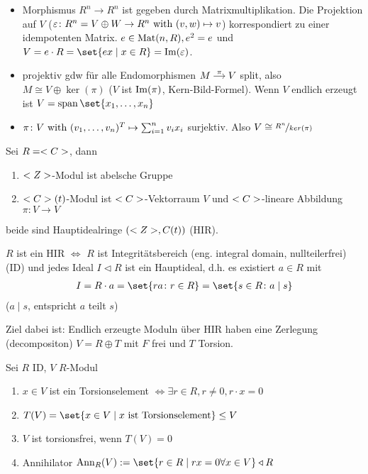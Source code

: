 \begin{erinnerung}
	\begin{itemize}
		\item Morphismus $R^n \to R^n$ ist gegeben durch Matrixmultiplikation. Die Projektion auf $V$ ($\varepsilon \colon R^n = V \oplus W \to R^n \text{ with } (v,w) \mapsto v$) korrespondiert zu einer idempotenten Matrix. $e \in \operatorname{Mat}(n,R), e^2 = e$ und $V = e\cdot R = \set{e x \mid x \in R} = \Image(\epsilon)$. 
		\item projektiv gdw für alle Endomorphismen $\begin{tikzcd}[cramped, sep=small]
		M \arrow[r, "\pi"] & V
		\end{tikzcd}$ split, also $M \cong V \oplus \ker(\pi)$ ($V$ ist $\operatorname{Im}(\pi)$, Kern-Bild-Formel). Wenn $V$ endlich erzeugt ist $V = \Span\set{x_1, \dots, x_n}$
		\item $\pi \colon V \text{ with } (v_1, \dots, v_n)^T \mapsto \sum_{i=1}^n v_i x_i$ surjektiv. Also $V \cong \lnkset{R^n}{ker(\pi)}$
	\end{itemize}
\end{erinnerung}
\begin{example}
	Sei $R = <C>$, dann
	\begin{enumerate}
		\item $<Z>$-Modul ist abelsche Gruppe
		\item $<C>(t)$-Modul ist $<C>$-Vektorraum $V$ und $<C>$-lineare Abbildung $\pi\colon V \to V$
	\end{enumerate}
	beide sind Hauptidealringe $(<Z>, C(t))$ (HIR).
\end{example}
\begin{definition}
	$R$ ist ein HIR $\Leftrightarrow$ $R$ ist Integritätsbereich (eng. integral domain, nullteilerfrei) (ID) und jedes Ideal $I \lhd R$ ist ein Hauptideal, d.h. es existiert $a \in R$ mit
	\begin{align*}
		I = R \cdot a = \set{ra \colon r \in R} = \set{s \in R \colon a \mid s}
	\end{align*}
	($a \mid s$, entspricht $a$ teilt $s$)
\end{definition}
Ziel dabei ist: Endlich erzeugte Moduln über HIR haben eine Zerlegung (decompositon) $V = R \oplus T$ mit $F$ frei und $T$ Torsion.
\begin{definition}
	Sei $R$ ID, $V$ $R$-Modul
	\begin{enumerate}
		\item $x \in V$ ist ein Torsionselement $\Leftrightarrow \exists r \in R, r \neq 0, r\cdot x = 0$
		\item $T(V) = \set{x \in V \mid x \text{ ist Torsionselement}} \le V$
		\item $V$ ist torsionsfrei, wenn $T(V) = 0$
		\item Annihilator $\Ann_R (V) := \set{r \in R \mid rx = 0 \forall x \in V} \lhd R$
	\end{enumerate}
\end{definition}
